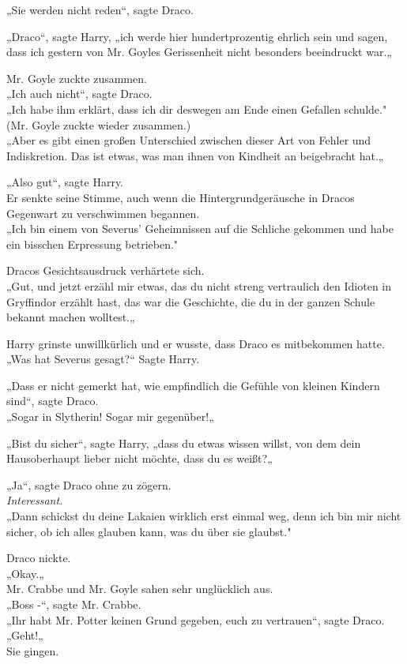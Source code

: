 {„Sie werden nicht reden“, sagte Draco.

„Draco“, sagte Harry, „ich werde hier hundertprozentig ehrlich sein und sagen, dass ich gestern von Mr. Goyles Gerissenheit nicht besonders beeindruckt war.„

Mr. Goyle zuckte zusammen.\\ „Ich auch nicht“, sagte Draco.\\ „Ich habe ihm erklärt, dass ich dir deswegen am Ende einen Gefallen schulde."\\ (Mr. Goyle zuckte wieder zusammen.)\\ „Aber es gibt einen großen Unterschied zwischen dieser Art von Fehler und Indiskretion. Das ist etwas, was man ihnen von Kindheit an beigebracht hat.„

„Also gut“, sagte Harry.\\ Er senkte seine Stimme, auch wenn die Hintergrundgeräusche in Dracos Gegenwart zu verschwimmen begannen.\\ „Ich bin einem von Severus' Geheimnissen auf die Schliche gekommen und habe ein bisschen Erpressung betrieben."

Dracos Gesichtsausdruck verhärtete sich.\\ „Gut, und jetzt erzähl mir etwas, das du nicht streng vertraulich den Idioten in Gryffindor erzählt hast, das war die Geschichte, die du in der ganzen Schule bekannt machen wolltest.„

Harry grinste unwillkürlich und er wusste, dass Draco es mitbekommen hatte.\\ „Was hat Severus gesagt?“ Sagte Harry.

„Dass er nicht gemerkt hat, wie empfindlich die Gefühle von kleinen Kindern sind“, sagte Draco.\\ „Sogar in Slytherin! Sogar mir gegenüber!„

„Bist du sicher“, sagte Harry, „dass du etwas wissen willst, von dem dein Hausoberhaupt lieber nicht möchte, dass du es weißt?„

„Ja“, sagte Draco ohne zu zögern.\\ \emph{Interessant}.\\ „Dann schickst du deine Lakaien wirklich erst einmal weg, denn ich bin mir nicht sicher, ob ich alles glauben kann, was du über sie glaubst."

Draco nickte.\\ „Okay.„\\ Mr. Crabbe und Mr. Goyle sahen sehr unglücklich aus.\\ „Boss -“, sagte Mr. Crabbe.\\ „Ihr habt Mr. Potter keinen Grund gegeben, euch zu vertrauen“, sagte Draco. „Geht!„\\ Sie gingen.

}
